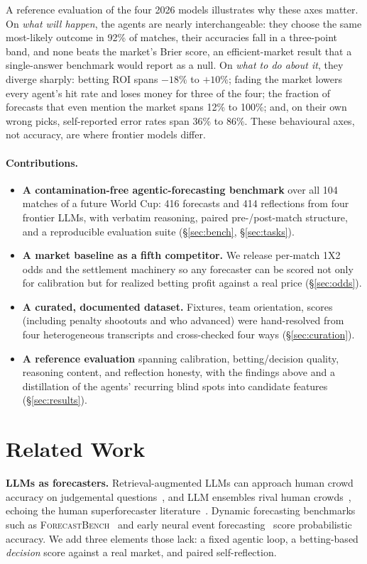 \documentclass[sigconf,nonacm]{acmart}
\begin{document}
A reference evaluation of the four 2026 models illustrates why these axes
matter. On \emph{what will happen}, the agents are nearly interchangeable: they
choose the same most-likely outcome in 92\% of matches, their accuracies fall in
a three-point band, and none beats the market's Brier score, an
efficient-market result that a single-answer benchmark would report as a null.
On \emph{what to do about it}, they diverge sharply: betting ROI spans $-18\%$
to $+10\%$; fading the market lowers every agent's hit rate and loses money for
three of the four; the fraction of
forecasts that even mention the market spans 12\% to 100\%; and, on their own
wrong picks, self-reported error rates span 36\% to 86\%. These behavioural
axes, not accuracy, are where frontier models differ.

\paragraph{Contributions.}
\begin{itemize}[leftmargin=1.1em,topsep=2pt,itemsep=1pt]
\item \textbf{A contamination-free agentic-forecasting benchmark} over all 104
  matches of a future World Cup: 416 forecasts and 414 reflections from four
  frontier LLMs, with verbatim reasoning, paired pre-/post-match structure, and
  a reproducible evaluation suite (\S\ref{sec:bench}, \S\ref{sec:tasks}).
\item \textbf{A market baseline as a fifth competitor.} We release per-match 1X2
  odds and the settlement machinery so any forecaster can be scored not only for
  calibration but for realized betting profit against a real price
  (\S\ref{sec:odds}).
\item \textbf{A curated, documented dataset.} Fixtures, team orientation, scores
  (including penalty shootouts and who advanced) were hand-resolved from four
  heterogeneous transcripts and cross-checked four ways (\S\ref{sec:curation}).
\item \textbf{A reference evaluation} spanning calibration, betting/decision
  quality, reasoning content, and reflection honesty, with the findings above
  and a distillation of the agents' recurring blind spots into candidate
  features (\S\ref{sec:results}).
\end{itemize}

\section{Related Work}
\textbf{LLMs as forecasters.} Retrieval-augmented LLMs can approach human crowd
accuracy on judgemental questions~\cite{halawi2024forecasting}, and LLM
ensembles rival human crowds~\cite{schoenegger2024wisdom}, echoing the human
superforecaster literature~\cite{tetlock2015superforecasting}. Dynamic
forecasting benchmarks such as \textsc{ForecastBench}~\cite{karger2024forecastbench}
and early neural event forecasting~\cite{zou2022forecasting} score probabilistic
accuracy. We add three elements those lack: a fixed agentic loop, a betting-based
\emph{decision} score against a real market, and paired self-reflection.
\end{document}
